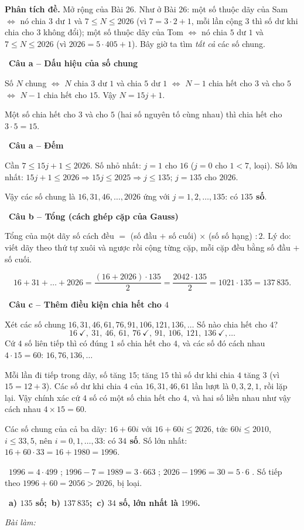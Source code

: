 \documentclass[11pt]{article}
\newif\ifsol \solfalse
\providecommand{\AnsWord}{Đáp số}
\newcommand{\StuProb}[2]{\begin{probboxS}{#1}{#2}\StuProbBody\end{probboxS}}
\newcommand{\ans}[1]{\par\smallskip{\bfseries\color{tmGreen!88!black}\AnsWord:}\ {\bfseries\color{AnsRed}#1}\par}
\newcommand{\probsol}[1]{%
  \begin{lrbox}{\solmeasure}\begin{minipage}{\dimexpr\linewidth-24pt\relax}#1\end{minipage}\end{lrbox}%
  \ifsol
    \begin{solbox}#1\end{solbox}%
  \else
    \setlength{\solht}{\dimexpr\ht\solmeasure+\dp\solmeasure+0.85cm\relax}%
    \ifdim\solht<1.35cm\setlength{\solht}{1.35cm}\fi
    \ifdim\solht>\StudentMaxWork\setlength{\solht}{\StudentMaxWork}\fi
    \par\noindent\begin{minipage}{\linewidth}%
    \expandafter\StuProb\StuProbArgs
    \begin{tcolorbox}[colback=white,colframe=Line,boxrule=0.8pt,arc=5pt,
      left=8pt,right=8pt,top=4pt,bottom=4pt,height=\solht]{\footnotesize\color{Slate}\itshape\WorkWord}\end{tcolorbox}%
    \end{minipage}\par\medskip
  \fi}
\newlength{\StudentMaxWork}\setlength{\StudentMaxWork}{4.5cm}
\newcommand{\step}[2]{\par\smallskip\noindent{\bfseries\color{tmBlue!85!black}\StepWord~#1.}\ {\bfseries #2}\par\nopagebreak}
\newcommand{\verify}[1]{\par\smallskip\noindent{\bfseries\color{tmGreen!80!black}\faCheckCircle\ \CheckWord}\ #1\par}
\def\WorkWord{Bài làm:}
\def\AnsWord{Đáp số}
\def\StepWord{Bước}
\def\CheckWord{Thử lại:}
\begin{document}
\probsol{
\textbf{Phân tích đề.} Mở rộng của Bài 26. Như ở Bài 26: một số thuộc dãy của Sam $\iff$ nó chia $3$ dư $1$ và $7\le N\le 2026$ (vì $7=3\cdot 2+1$, mỗi lần cộng $3$ thì số dư khi chia cho $3$ không đổi); một số thuộc dãy của Tom $\iff$ nó chia $5$ dư $1$ và $7\le N\le 2026$ (vì $2026=5\cdot 405+1$). Bây giờ ta tìm \emph{tất cả} các số chung.

\step{1}{Câu a -- Dấu hiệu của số chung}
Số $N$ chung $\iff$ $N$ chia $3$ dư $1$ và chia $5$ dư $1$ $\iff$ $N-1$ chia hết cho $3$ và cho $5$ $\iff$ $N-1$ chia hết cho $15$. Vậy $N=15j+1$.
\begin{recallbox}Một số chia hết cho $3$ và cho $5$ (hai số nguyên tố cùng nhau) thì chia hết cho $3\cdot 5=15$.\end{recallbox}

\step{2}{Câu a -- Đếm}
Cần $7\le 15j+1\le 2026$. Số nhỏ nhất: $j=1$ cho $16$ ($j=0$ cho $1<7$, loại). Số lớn nhất: $15j+1\le 2026 \Rightarrow 15j\le 2025 \Rightarrow j\le 135$; $j=135$ cho $2026$.\par
Vậy các số chung là $16, 31, 46,\dots, 2026$ ứng với $j=1,2,\dots,135$: có \textbf{$135$ số}.

\step{3}{Câu b -- Tổng (cách ghép cặp của Gauss)}
\begin{recallbox}Tổng của một dãy số cách đều $=$ (số đầu $+$ số cuối) $\times$ (số số hạng) $:2$. Lý do: viết dãy theo thứ tự xuôi và ngược rồi cộng từng cặp, mỗi cặp đều bằng số đầu $+$ số cuối.\end{recallbox}
\[ 16+31+\dots+2026=\frac{(16+2026)\cdot 135}{2}=\frac{2042\cdot 135}{2}=1021\cdot 135=137\,835. \]

\step{4}{Câu c -- Thêm điều kiện chia hết cho $4$}
Xét các số chung $16, 31, 46, 61, 76, 91, 106, 121, 136,\dots$ Số nào chia hết cho $4$?
\[ 16\ \checkmark,\ 31,\ 46,\ 61,\ 76\ \checkmark,\ 91,\ 106,\ 121,\ 136\ \checkmark,\dots \]
Cứ $4$ số liên tiếp thì có đúng $1$ số chia hết cho $4$, và các số đó cách nhau $4\cdot 15=60$: $16, 76, 136, \dots$
\begin{proofbox}Mỗi lần đi tiếp trong dãy, số tăng $15$; tăng $15$ thì số dư khi chia $4$ tăng $3$ (vì $15=12+3$). Các số dư khi chia $4$ của $16,31,46,61$ lần lượt là $0,3,2,1$, rồi lặp lại. Vậy chính xác cứ $4$ số có một số chia hết cho $4$, và hai số liền nhau như vậy cách nhau $4\times15=60$.\end{proofbox}
Các số chung của cả ba dãy: $16+60i$ với $16+60i\le 2026$, tức $60i\le 2010$, $i\le 33{,}5$, nên $i=0,1,\dots,33$: có \textbf{$34$ số}. Số lớn nhất: $16+60\cdot 33=16+1980=1996$.
\verify{$1996=4\cdot 499$ \checkmark; $1996-7=1989=3\cdot 663$ \checkmark; $2026-1996=30=5\cdot 6$ \checkmark. Số tiếp theo $1996+60=2056>2026$, bị loại.}
\ans{a) $135$ số;\ b) $137\,835$;\ c) $34$ số, lớn nhất là $1996$.}
}
\end{document}
